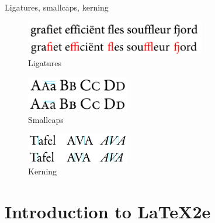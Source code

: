 \documentclass[10pt,times]{beamer}
\begin{document}
\begin{frame}{Ligatures, smallcaps, kerning}
\begin{figure}
  \centering
  \includegraphics[width=0.7\textwidth]{figs/ligatures.png}
  \caption*{Ligatures}
\end{figure}
\begin{figure}
  \centering
  \includegraphics[width=0.4\textwidth]{figs/smallcaps.png}
  \caption*{Smallcaps}
\end{figure}
\begin{figure}
  \centering
  \includegraphics[width=0.4\textwidth]{figs/kerning.png}
  \caption*{Kerning}
\end{figure}
\end{frame}


\section{Introduction to \LaTeX2e}

\end{document}
